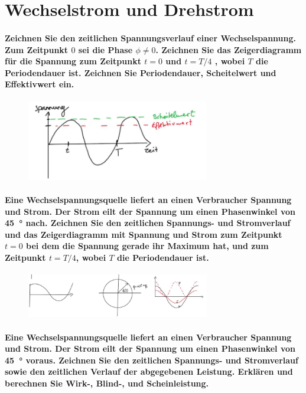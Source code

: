 \documentclass[a4paper, 11pt, parskip=half]{scrartcl}
\begin{document}
\newpage

\section{Wechselstrom und Drehstrom}

\paragraph{Zeichnen Sie den zeitlichen Spannungsverlauf einer Wechselspannung. Zum Zeitpunkt $0$ sei
die Phase $\phi \neq 0$. Zeichnen Sie das Zeigerdiagramm für die Spannung zum Zeitpunkt $t=0$ und
$t=T/4$ , wobei $T$ die Periodendauer ist. Zeichnen Sie Periodendauer, Scheitelwert und Effektivwert
ein.}


\begin{figure}[H]
    \centering
    \includegraphics[width=8cm]{image/9/wechselstrom1}
\end{figure}



\paragraph{Eine Wechselspannungsquelle liefert an einen Verbraucher Spannung und Strom. Der Strom
eilt der Spannung um einen Phasenwinkel von \SI{45}{\degree} nach. Zeichnen Sie den zeitlichen
Spannungs- und Stromverlauf und das Zeigerdiagramm mit Spannung und Strom zum Zeitpunkt $t=0$ bei
dem die Spannung gerade ihr Maximum hat, und zum Zeitpunkt $t=T/4$, wobei $T$ die Periodendauer
ist.}


\begin{figure}[H]
    \centering
    \includegraphics[width=8cm]{image/9/wechselstrom2}
\end{figure}


\paragraph{Eine Wechselspannungsquelle liefert an einen Verbraucher Spannung und Strom. Der Strom
eilt der Spannung um einen Phasenwinkel von \SI{45}{\degree} voraus. Zeichnen Sie den zeitlichen
Spannungs- und Stromverlauf sowie den zeitlichen Verlauf der abgegebenen Leistung. Erklären und
berechnen Sie Wirk-, Blind-, und Scheinleistung.}
\end{document}
